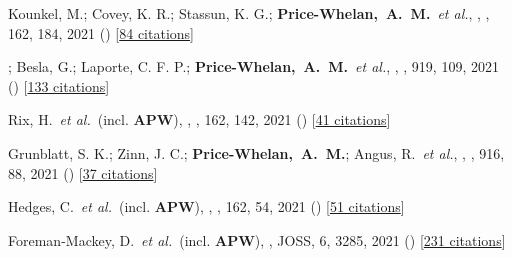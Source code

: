 \item[{\color{deemph}\scriptsize91}]Kounkel, M.; Covey, K. R.; Stassun, K. G.; \textbf{Price-Whelan,~A.~M.}~\textit{et al.}, , \aj, 162, 184, 2021 () [\href{http://adsabs.harvard.edu/abs/2021AJ....162..184K}{84 citations}]

\item[{\color{deemph}\scriptsize90}]; Besla, G.; Laporte, C. F. P.; \textbf{Price-Whelan,~A.~M.}~\textit{et al.}, , \apj, 919, 109, 2021 () [\href{http://adsabs.harvard.edu/abs/2021ApJ...919..109G}{133 citations}]

\item[{\color{deemph}\scriptsize89}]Rix, H.~\textit{et al.}~(incl. \textbf{APW}), , \aj, 162, 142, 2021 () [\href{http://adsabs.harvard.edu/abs/2021AJ....162..142R}{41 citations}]

\item[{\color{deemph}\scriptsize88}]Grunblatt, S. K.; Zinn, J. C.; \textbf{Price-Whelan,~A.~M.}; Angus, R.~\textit{et al.}, , \apj, 916, 88, 2021 () [\href{http://adsabs.harvard.edu/abs/2021ApJ...916...88G}{37 citations}]

\item[{\color{deemph}\scriptsize87}]Hedges, C.~\textit{et al.}~(incl. \textbf{APW}), , \aj, 162, 54, 2021 () [\href{http://adsabs.harvard.edu/abs/2021AJ....162...54H}{51 citations}]

\item[{\color{deemph}\scriptsize86}]Foreman-Mackey, D.~\textit{et al.}~(incl. \textbf{APW}), , JOSS, 6, 3285, 2021 () [\href{http://adsabs.harvard.edu/abs/2021JOSS....6.3285F}{231 citations}]

